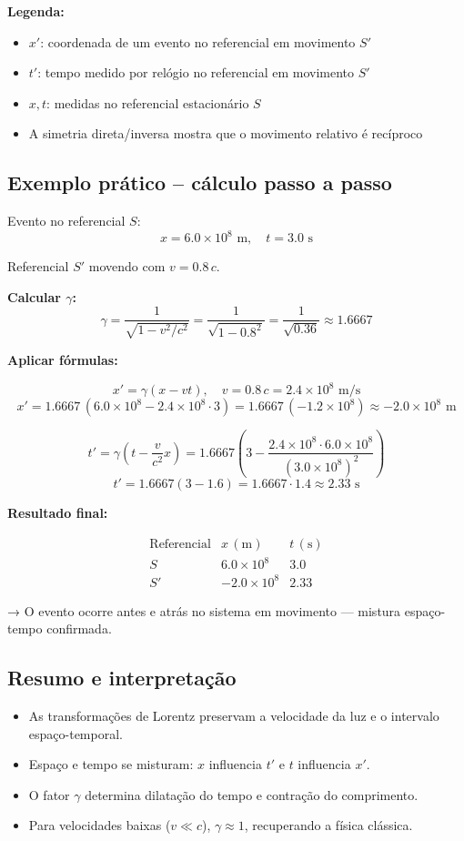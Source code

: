 \documentclass[12pt,a4paper]{article}
\begin{document}
\textbf{Legenda:}
\begin{itemize}
    \item $x'$: coordenada de um evento no referencial em movimento $S'$
    \item $t'$: tempo medido por relógio no referencial em movimento $S'$
    \item $x, t$: medidas no referencial estacionário $S$
    \item A simetria direta/inversa mostra que o movimento relativo é recíproco
\end{itemize}

\subsection{Exemplo prático – cálculo passo a passo}

Evento no referencial $S$:
\[
x = 6.0 \times 10^8 \text{ m}, \quad t = 3.0 \text{ s}
\]

Referencial $S'$ movendo com $v = 0.8\,c$.

\textbf{Calcular $\gamma$:}
\[
\gamma = \frac{1}{\sqrt{1 - v^2/c^2}} = \frac{1}{\sqrt{1 - 0.8^2}} = \frac{1}{\sqrt{0.36}} \approx 1.6667
\]

\textbf{Aplicar fórmulas:}

\[
x' = \gamma (x - v t), \quad v = 0.8 \, c = 2.4 \times 10^8 \text{ m/s}
\]
\[
x' = 1.6667 \, (6.0 \times 10^8 - 2.4 \times 10^8 \cdot 3) = 1.6667 \, (-1.2 \times 10^8) \approx -2.0 \times 10^8 \text{ m}
\]

\[
t' = \gamma \left(t - \frac{v}{c^2} x \right) = 1.6667 \left(3 - \frac{2.4 \times 10^8 \cdot 6.0 \times 10^8}{(3.0 \times 10^8)^2} \right)
\]
\[
t' = 1.6667 (3 - 1.6) = 1.6667 \cdot 1.4 \approx 2.33 \text{ s}
\]

\textbf{Resultado final:}

\[
\begin{array}{c|c|c}
\text{Referencial} & x \,(\text{m}) & t \,(\text{s}) \\
\hline
S & 6.0 \times 10^8 & 3.0 \\
S' & -2.0 \times 10^8 & 2.33
\end{array}
\]

→ O evento ocorre antes e atrás no sistema em movimento — mistura espaço-tempo confirmada.

\subsection{Resumo e interpretação}

\begin{itemize}
    \item As transformações de Lorentz preservam a velocidade da luz e o intervalo espaço-temporal.
    \item Espaço e tempo se misturam: $x$ influencia $t'$ e $t$ influencia $x'$.
    \item O fator $\gamma$ determina dilatação do tempo e contração do comprimento.
    \item Para velocidades baixas ($v \ll c$), $\gamma \approx 1$, recuperando a física clássica.
\end{itemize}
\end{document}
